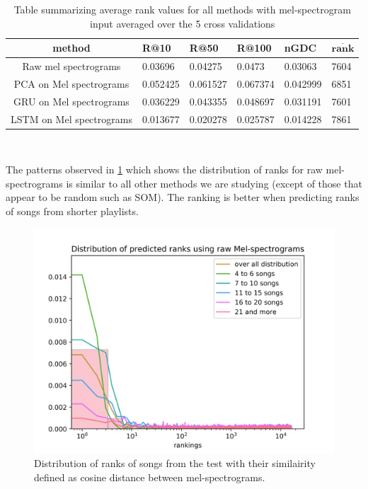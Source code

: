 \begin{table}[h!]
\centering
\renewcommand{\arraystretch}{1.5}
\begin{tabu} to 1\textwidth { | c || X[c] | X[c] | X[c] | X[c] | X[c] |}
 \hline
 \textbf{method} & \textbf{R@10} & \textbf{R@50} & \textbf{R@100} & \textbf{nGDC} & $ \boldsymbol{\overline{rank}} $ \\
 \hline
 \hline
 Raw mel spectrograms & 0.03696 & 0.04275 & 0.0473 & 0.03063 & 7604 \\
 \hline
 PCA on Mel spectrograms & 0.052425 & 0.061527 & 0.067374 & 0.042999 & 6851 \\
 \hline
 GRU on Mel spectrograms & 0.036229 & 0.043355 & 0.048697 & 0.031191 & 7601 \\
 \hline
 LSTM on Mel spectrograms & 0.013677 & 0.020278 & 0.025787 & 0.014228 & 7861\\
\end{tabu} \\
\caption{Table summarizing average rank values for all methods with mel-spectrogram input averaged over the 5 cross validations}
\label{table:mel_spec_methods}
\end{table}

The patterns observed in \ref{fig:mel_graph} which shows the distribution of ranks for raw mel-spectrograms is similar to all other methods we are studying (except of those that appear to be random such as SOM). The ranking is better when predicting ranks of songs from shorter playlists. 

\begin{figure}[h]
    \centering
	\includegraphics[width=120mm]{./img/mel_graph.png}
	\caption{Distribution of ranks of songs from the test with their similairity defined as cosine distance between mel-spectrograms.}
	\label{fig:mel_graph}
\end{figure}

